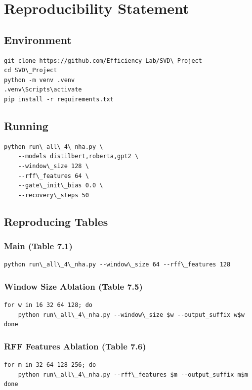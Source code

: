 
\section{Reproducibility Statement}

\subsection{Environment}

\begin{lstlisting}
git clone https://github.com/Efficiency Lab/SVD\_Project
cd SVD\_Project
python -m venv .venv
.venv\Scripts\activate
pip install -r requirements.txt
\end{lstlisting}

\subsection{Running}

\begin{lstlisting}
python run\_all\_4\_nha.py \
    --models distilbert,roberta,gpt2 \
    --window\_size 128 \
    --rff\_features 64 \
    --gate\_init\_bias 0.0 \
    --recovery\_steps 50
\end{lstlisting}

\subsection{Reproducing Tables}

\subsubsection{Main (Table 7.1)}
\begin{lstlisting}
python run\_all\_4\_nha.py --window\_size 64 --rff\_features 128
\end{lstlisting}

\subsubsection{Window Size Ablation (Table 7.5)}
\begin{lstlisting}
for w in 16 32 64 128; do
    python run\_all\_4\_nha.py --window\_size $w --output_suffix w$w
done
\end{lstlisting}

\subsubsection{RFF Features Ablation (Table 7.6)}
\begin{lstlisting}
for m in 32 64 128 256; do
    python run\_all\_4\_nha.py --rff\_features $m --output_suffix m$m
done
\end{lstlisting}

